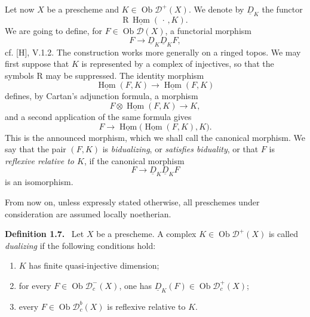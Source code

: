 \documentclass[11pt]{article}
\theoremstyle{plain}
\theoremstyle{definition}
\theoremstyle{remark}
\newenvironment{statement}[1]{\par\medskip\noindent\textbf{#1.}\ }{\par\medskip}
\newcommand{\D}{\mathcal D}\newcommand{\E}{\mathcal E}\newcommand{\F}{\mathcal F}
\DeclareMathOperator{\Hom}{Hom}
\DeclareMathOperator{\ob}{Ob}
\newcommand{\R}{\mathrm R}
\begin{document}
Let now $X$ be a prescheme and $K\in\ob\D^+(X)$. We denote by $\underline D_K$ the functor
\[
   \R\,\underline{\Hom}(\,\cdot\,,K).
\]
We are going to define, for $F\in\ob\D(X)$, a functorial morphism
\[
   F\longrightarrow \underline D_K\underline D_KF,
\]
cf. [H], V.1.2. The construction works more generally on a ringed topos. We may first suppose that $K$ is represented by a complex of injectives, so that the symbols $\R$ may be suppressed. The identity morphism
\[
   \underline{\Hom}(F,K)\longrightarrow\underline{\Hom}(F,K)
\]
defines, by Cartan's adjunction formula, a morphism
\[
   F\otimes\underline{\Hom}(F,K)\longrightarrow K,
\]
and a second application of the same formula gives
\[
   F\longrightarrow\underline{\Hom}\bigl(\underline{\Hom}(F,K),K\bigr).
\]
This is the announced morphism, which we shall call the canonical morphism. We say that the pair $(F,K)$ is \emph{bidualizing}, or \emph{satisfies biduality}, or that $F$ is \emph{reflexive relative to $K$}, if the canonical morphism
\[
   F\longrightarrow \underline D_K\underline D_KF
\]
is an isomorphism.

From now on, unless expressly stated otherwise, all preschemes under consideration are assumed locally noetherian.

\begin{statement}{Definition 1.7}
Let $X$ be a prescheme. A complex $K\in\ob\D^+(X)$ is called \emph{dualizing} if the following conditions hold:
\begin{enumerate}[label=(\roman*)]
\item $K$ has finite quasi-injective dimension;
\item for every $F\in\ob\D_c^-(X)$, one has $\underline D_K(F)\in\ob\D_c^+(X)$;
\item every $F\in\ob\D_c^b(X)$ is reflexive relative to $K$.
\end{enumerate}
\end{statement}
\end{document}
